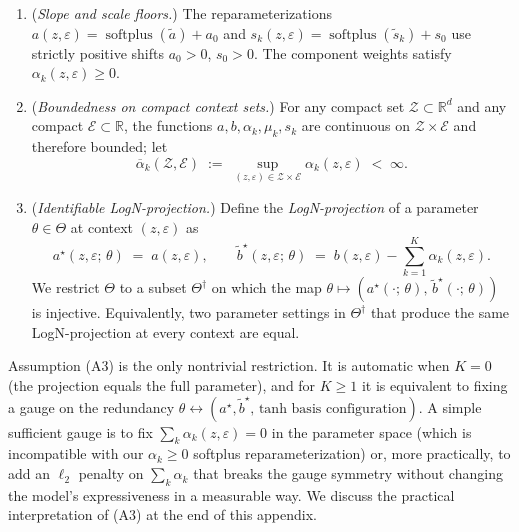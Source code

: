 \begin{enumerate}
    \item[\textbf{(A1)}] (\emph{Slope and scale floors.})
    The reparameterizations $a(z, \varepsilon) = \operatorname{softplus}(\widetilde{a}) + a_0$
    and $s_k(z, \varepsilon) = \operatorname{softplus}(\widetilde{s}_k) + s_0$
    use strictly positive shifts $a_0 > 0$, $s_0 > 0$. The
    component weights satisfy $\alpha_k(z, \varepsilon) \ge 0$.

    \item[\textbf{(A2)}] (\emph{Boundedness on compact context sets.})
    For any compact set $\mathcal{Z} \subset \mathbb{R}^d$ and any
    compact $\mathcal{E} \subset \mathbb{R}$, the functions
    $a, b, \alpha_k, \mu_k, s_k$ are continuous on
    $\mathcal{Z} \times \mathcal{E}$ and therefore bounded; let
    \[
        \overline{\alpha}_k(\mathcal{Z}, \mathcal{E})
        \;:=\; \sup_{(z, \varepsilon) \in \mathcal{Z} \times \mathcal{E}}
            \alpha_k(z, \varepsilon) \;<\; \infty.
    \]

    \item[\textbf{(A3)}] (\emph{Identifiable LogN-projection.})
    Define the \emph{LogN-projection} of a parameter $\theta \in \Theta$
    at context $(z, \varepsilon)$ as
    \begin{equation}
        a^\star(z, \varepsilon;\, \theta) \;=\; a(z, \varepsilon),
        \qquad
        \widetilde{b}^\star(z, \varepsilon;\, \theta)
        \;=\; b(z, \varepsilon) - \sum_{k=1}^{K} \alpha_k(z, \varepsilon).
        \label{eq:logn-projection}
    \end{equation}
    We restrict $\Theta$ to a subset $\Theta^\dagger$ on which the map
    $\theta \mapsto (a^\star(\cdot;\, \theta),\, \widetilde{b}^\star(\cdot;\, \theta))$
    is injective. Equivalently, two parameter settings in $\Theta^\dagger$
    that produce the same LogN-projection at every context are equal.
\end{enumerate}

Assumption (A3) is the only nontrivial restriction. It is automatic when
$K = 0$ (the projection equals the full parameter), and for $K \ge 1$ it
is equivalent to fixing a gauge on the redundancy
$\theta \leftrightarrow (a^\star, \widetilde{b}^\star,\, \text{tanh basis configuration})$.
A simple sufficient gauge is to fix $\sum_k \alpha_k(z, \varepsilon) = 0$
in the parameter space (which is incompatible with our $\alpha_k \ge 0$
softplus reparameterization) or, more practically, to add an
$\ell_2$ penalty on $\sum_k \alpha_k$ that breaks the gauge symmetry
without changing the model's expressiveness in a measurable way. We
discuss the practical interpretation of (A3) at the end of this
appendix.

